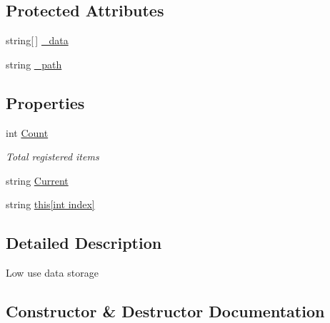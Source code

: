 \subsection*{Protected Attributes}
\begin{DoxyCompactItemize}
\item 
string\mbox{[}$\,$\mbox{]} \hyperlink{classOTA_1_1Misc_1_1DataRegister_afccbfd13199ec11b98c50cdfe1845723}{\+\_\+data}
\item 
string \hyperlink{classOTA_1_1Misc_1_1DataRegister_a301dbb9913055444022b6d007e61871d}{\+\_\+path}
\end{DoxyCompactItemize}
\subsection*{Properties}
\begin{DoxyCompactItemize}
\item 
int \hyperlink{classOTA_1_1Misc_1_1DataRegister_aad462966ed963f892117056de1eba502}{Count}
\begin{DoxyCompactList}\small\item\em Total registered items \end{DoxyCompactList}\item 
string \hyperlink{classOTA_1_1Misc_1_1DataRegister_ac1ecbacad011388594d776ae8043553d}{Current}
\item 
string \hyperlink{classOTA_1_1Misc_1_1DataRegister_ac296626b7fb007c1d6674f5ddce5b3c6}{this\mbox{[}int index\mbox{]}}
\end{DoxyCompactItemize}


\subsection{Detailed Description}
Low use data storage 



\subsection{Constructor \& Destructor Documentation}
\hypertarget{classOTA_1_1Misc_1_1DataRegister_a9c5281ecdfbadc5af6dfa323f1d4d7eb}{}
